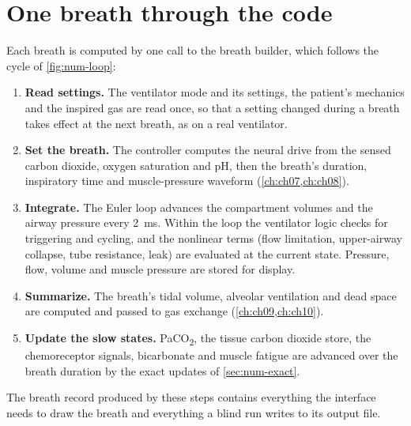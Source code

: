 \section{One breath through the code}
\label{sec:impl-breath}
Each breath is computed by one call to the breath builder, which follows the cycle of \cref{fig:num-loop}:
\begin{enumerate}[leftmargin=*]
  \item \textbf{Read settings.} The ventilator mode and its settings, the patient's mechanics and the inspired gas are read once, so that a setting changed during a breath takes effect at the next breath, as on a real ventilator.
  \item \textbf{Set the breath.} The controller computes the neural drive from the sensed carbon dioxide, oxygen saturation and pH, then the breath's duration, inspiratory time and muscle-pressure waveform (\cref{ch:ch07,ch:ch08}).
  \item \textbf{Integrate.} The Euler loop advances the compartment volumes and the airway pressure every \SI{2}{\milli\second}. Within the loop the ventilator logic checks for triggering and cycling, and the nonlinear terms (flow limitation, upper-airway collapse, tube resistance, leak) are evaluated at the current state. Pressure, flow, volume and muscle pressure are stored for display.
  \item \textbf{Summarize.} The breath's tidal volume, alveolar ventilation and dead space are computed and passed to gas exchange (\cref{ch:ch09,ch:ch10}).
  \item \textbf{Update the slow states.} PaCO\textsubscript{2}, the tissue carbon dioxide store, the chemoreceptor signals, bicarbonate and muscle fatigue are advanced over the breath duration by the exact updates of \cref{sec:num-exact}.
\end{enumerate}
The breath record produced by these steps contains everything the interface needs to draw the breath and everything a blind run writes to its output file.

